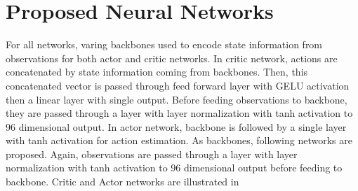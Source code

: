 \section{Proposed Neural Networks}
\label{sec:proposed_networks}

For all networks, varing backbones used to encode state information from observations for both actor and critic networks. 
In critic network, actions are concatenated by state information coming from backbones. 
Then, this concatenated vector is passed through feed forward layer with GELU activation then a linear layer with single output. 
Before feeding observations to backbone, they are passed through a layer with layer normalization with tanh activation to 96 dimensional output. 
In actor network, backbone is followed by a single layer with tanh activation for action estimation. 
As backbones, following networks are proposed. 
Again, observations are passed through a layer with layer normalization with tanh activation to 96 dimensional output before feeding to backbone. 
Critic and Actor networks are illustrated in  

